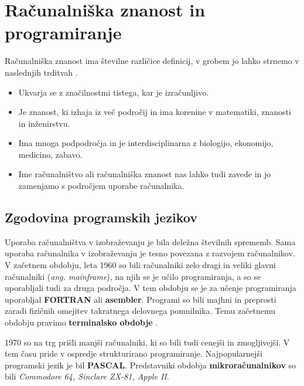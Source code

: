 \section{Računalniška znanost in programiranje}
\label{sec:računalniška_znanost_in_programiranje}

Računalniška znanost ima številne različice definicij, v grobem jo
lahko strnemo v naslednjih trditvah \cite{guideTCS}.

\begin{itemize}
\tightlist
\item Ukvarja se z značilnostmi tistega, kar je izračunljivo.
\item Je znanost, ki izhaja iz več področij in ima korenine v matematiki,
znanosti in inženirstvu.
\item Ima mnoga podpodročja in je interdisciplinarna z biologijo,
ekonomijo, medicino, zabavo.
\item Ime računalništvo ali računalniška znanost nas lahko tudi zavede in
jo zamenjamo s področjem uporabe računalnika.
\end{itemize}


\subsection{Zgodovina programskih jezikov}
\label{sec:zgodovina_programskih_jezikov}



Uporaba računalništva v izobraževanju je bila deležna številnih
sprememb. Sama uporaba računalnika v izobraževanju je tesno povezana z
razvojem računalnikov.  V začetnem obdobju, leta 1960 so bili računalniki zelo dragi in veliki glavni računalniki (\emph{ang. mainframe}), na njih se je učilo programiranja, a so se
uporabljali tudi za druga področja. V tem obdobju se je za učenje
programiranja uporabljal \textbf{FORTRAN} ali
\textbf{asembler}. Programi so bili majhni in preprosti zaradi fizičnih
omejitev takratnega delovnega pomnilnika. Temu začetnemu obdobju pravimo
\textbf{terminalsko obdobje} \cite{gerlic_2000}.

1970 so na trg prišli manjši računalniki, ki so bili tudi cenejši in
zmogljivejši. V tem času pride v ospredje strukturirano programiranje.
Najpopularnejši programski jezik je bil \textbf{PASCAL}. Predstavniki
obdobja \textbf{mikroračunalnikov} so bili \emph{Commodore 64,
  Sinclare ZX-81, Apple II}.

